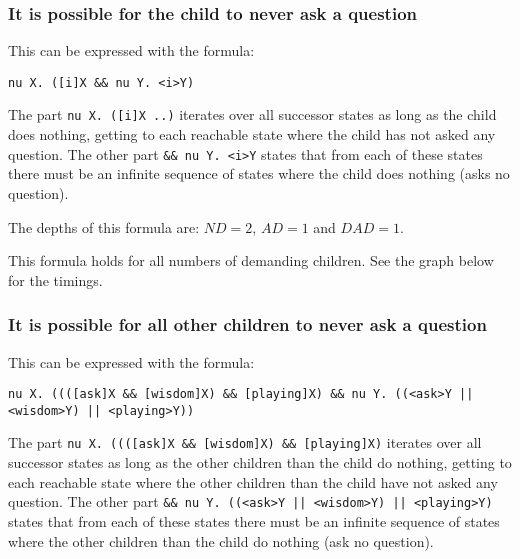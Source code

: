 \documentclass[10pt,a4paper]{article}
\begin{document}
\subsubsection{It is possible for the child to never ask a question}
This can be expressed with the formula:

\begin{center}
	{\tt nu X. ([i]X \&\& nu Y. <i>Y)}
\end{center}	
	
The part {\tt nu X. ([i]X ..)} iterates over all successor states as long as the child does nothing, getting to each reachable state where the child has not asked any question. The other part {\tt \&\& nu Y. <i>Y} states that from each of these states there must be an infinite sequence of states where the child does nothing (asks no question).

The depths of this formula are: $ND = 2$, $AD = 1$ and $DAD = 1$.

This formula holds for all numbers of demanding children. See the graph below for the timings.


\subsubsection{It is possible for all other children to never ask a question}
This can be expressed with the formula:

\begin{center}
	{\tt nu X. ((([ask]X \&\& [wisdom]X) \&\& [playing]X) \&\& nu Y. ((<ask>Y || <wisdom>Y) || <playing>Y))}
\end{center}

The part {\tt nu X. ((([ask]X \&\& [wisdom]X) \&\& [playing]X)} iterates over all successor states as long as the other children than the child do nothing, getting to each reachable state where the other children than the child have not asked any question. The other part {\tt \&\& nu Y. ((<ask>Y || <wisdom>Y) || <playing>Y)} states that from each of these states there must be an infinite sequence of states where the other children than the child do nothing (ask no question).
\end{document}
